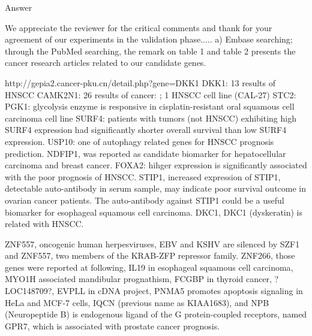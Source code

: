 \documentclass[preprint,12pt]{elsarticle}
\newenvironment{MyColorPar}[1]{%
    \leavevmode\color{#1}\ignorespaces%
}{%
}%
\begin{document}
\begin{MyColorPar}{blue}
Answer

We appreciate the reviewer for the critical comments and thank for your agreement of our experiments in the validation phase.....
a) Embase searching; %
\cite{Wei2019}
through the PubMed searching, the remark on table 1 and table 2 presents the cancer research articles related to our candidate genes.

http://gepia2.cancer-pku.cn/detail.php?gene=DKK1
DKK1: 13 results of HNSCC \cite{Shi2014}\cite{Gao2018}\cite{Chakraborty2020}\cite{Hu2020}\cite{Wei2020}
CAMK2N1: 26 results of cancer: ; 1 HNSCC cell line (CAL-27)\cite{Li2018b}
STC2: \cite{Ma2020}
PGK1: glycolysis enzyme is responsive in cisplatin-resistant oral squamous cell carcinoma cell line\cite{Nakamura2005}
SURF4: patients with tumors (not HNSCC) exhibiting high SURF4 expression had significantly shorter overall survival than low SURF4 expression.\cite{Kim2018a}
USP10: one of autophagy related genes for HNSCC prognosis prediction.\cite{Ren2020}
NDFIP1, was reported as candidate biomarker for hepatocellular carcinoma\cite{Zhang2019a} and breast cancer\cite{Tian2020}.
FOXA2: hihger expression is significantly associated with the poor prognosis of HNSCC\cite{Shen2017a}.
STIP1, increased expression of STIP1, detectable auto-antibody in serum sample, may indicate poor survival outcome in ovarian cancer patients\cite{Chao2013}\cite{Cho2014}. The auto-antibody against STIP1 could be a useful biomarker for esophageal squamous cell carcinoma\cite{Xu2017}.
DKC1, DKC1 (dyskeratin) is related with HNSCC\cite{Smith2010}.

ZNF557, oncogenic human herpesviruses, EBV and KSHV are silenced by SZF1 and ZNF557, two members of the KRAB-ZFP repressor family\cite{Li2018c}.
ZNF266, %
those genes were reported at following, 
IL19 in esophageal squamous cell carcinoma\cite{Hsing2013},
MYO1H associated mandibular prognathism\cite{Sun2018}, 
FCGBP in thyroid cancer\cite{Griffith2006}, 
?LOC148709?, 
EVPLL in cDNA project,
PNMA5 promotes apoptosis signaling in HeLa and MCF-7 cells\cite{Lee2016}, 
IQCN (previous name as KIAA1683), and 
NPB (Neuropeptide B) is endogenous ligand of the G protein-coupled receptors, named GPR7\cite{Andreis2005}, which is associated with prostate cancer prognosis\cite{Cottrell2007}. 




\end{MyColorPar}
\end{document}
